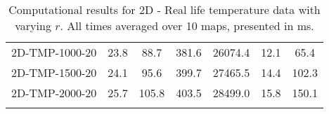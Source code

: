 \documentclass{article}
\begin{document}
\begin{center}
\begin{table}[h]
\begin{tabular}{|l||c|c|c|c|c|c|}
            2D-TMP-1000-20                 & 23.8      & 88.7       & 381.6       & 26074.4  & 12.1      & 65.4       \\
            2D-TMP-1500-20                 & 24.1      & 95.6       & 399.7       & 27465.5  & 14.4      & 102.3      \\
            2D-TMP-2000-20                 & 25.7      & 105.8      & 403.5       & 28499.0  & 15.8      & 150.1      \\
            \hline
            \caption{Computational results for 2D - Real life temperature data with varying $r$. All times averaged over 10 maps, presented in ms.}
        \end{tabular}
    \end{table}
\end{center}
\restoregeometry
\end{document}
